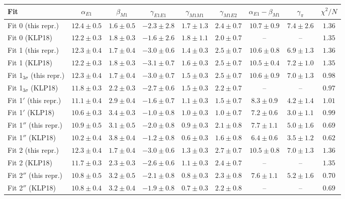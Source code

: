 \begin{tabular}{l|ccccccc|c}
\hline
Fit & $\alpha_{E1}$ & $\beta_{M1}$ & $\gamma_{E1E1}$ & $\gamma_{M1M1}$ & $\gamma_{M1E2}$ & $\alpha_{E1}-\beta_{M1}$ & $\gamma_\pi$ & $\chi^2/N$\\\hline
Fit 0 (this repr.) & $12.4\pm0.5$ & $1.6\pm0.5$ & $-2.3\pm2.8$ & $1.7\pm1.3$ & $2.4\pm0.7$ & $10.7\pm0.9$ & $7.4\pm2.6$ & $1.36$\\
Fit 0 (KLP18) & $12.2\pm0.3$ & $1.8\pm0.3$ & $-1.6\pm2.6$ & $1.8\pm1.1$ & $2.0\pm0.7$ & -- & -- & $1.35$\\\hline
Fit 1 (this repr.) & $12.3\pm0.4$ & $1.7\pm0.4$ & $-3.0\pm0.6$ & $1.4\pm0.3$ & $2.5\pm0.7$ & $10.6\pm0.8$ & $6.9\pm1.3$ & $1.36$\\
Fit 1 (KLP18) & $12.2\pm0.3$ & $1.8\pm0.3$ & $-3.1\pm0.7$ & $1.6\pm0.3$ & $2.5\pm0.7$ & $10.5\pm0.4$ & $7.2\pm1.0$ & $1.35$\\\hline
Fit 1$_{3\sigma}$ (this repr.) & $12.3\pm0.4$ & $1.7\pm0.4$ & $-3.0\pm0.7$ & $1.5\pm0.3$ & $2.5\pm0.7$ & $10.6\pm0.9$ & $7.0\pm1.3$ & $0.98$\\
Fit 1$_{3\sigma}$ (KLP18) & $11.8\pm0.3$ & $2.2\pm0.3$ & $-2.7\pm0.6$ & $1.5\pm0.3$ & $2.2\pm0.7$ & -- & -- & $0.97$\\\hline
Fit 1$'$ (this repr.) & $11.1\pm0.4$ & $2.9\pm0.4$ & $-1.6\pm0.7$ & $1.1\pm0.3$ & $1.5\pm0.7$ & $8.3\pm0.9$ & $4.2\pm1.4$ & $1.01$\\
Fit 1$'$ (KLP18) & $10.6\pm0.3$ & $3.4\pm0.3$ & $-1.0\pm0.8$ & $1.0\pm0.3$ & $1.0\pm0.7$ & $7.2\pm0.6$ & $3.0\pm1.1$ & $0.99$\\\hline
Fit 1$''$ (this repr.) & $10.9\pm0.5$ & $3.1\pm0.5$ & $-2.0\pm0.8$ & $0.9\pm0.3$ & $2.1\pm0.8$ & $7.7\pm1.1$ & $5.0\pm1.6$ & $0.69$\\
Fit 1$''$ (KLP18) & $10.2\pm0.4$ & $3.8\pm0.4$ & $-1.2\pm0.8$ & $0.6\pm0.3$ & $1.6\pm0.8$ & $6.4\pm0.6$ & $3.5\pm1.2$ & $0.62$\\\hline
Fit 2 (this repr.) & $12.3\pm0.4$ & $1.7\pm0.4$ & $-3.0\pm0.6$ & $1.3\pm0.3$ & $2.7\pm0.7$ & $10.5\pm0.8$ & $7.0\pm1.3$ & $1.36$\\
Fit 2 (KLP18) & $11.7\pm0.3$ & $2.3\pm0.3$ & $-2.6\pm0.6$ & $1.1\pm0.3$ & $2.4\pm0.7$ & -- & -- & $1.35$\\\hline
Fit 2$''$ (this repr.) & $10.8\pm0.5$ & $3.2\pm0.5$ & $-2.1\pm0.8$ & $0.8\pm0.3$ & $2.3\pm0.8$ & $7.6\pm1.1$ & $5.2\pm1.6$ & $0.70$\\
Fit 2$''$ (KLP18) & $10.8\pm0.4$ & $3.2\pm0.4$ & $-1.9\pm0.8$ & $0.7\pm0.3$ & $2.2\pm0.8$ & -- & -- & $0.69$\\\hline
\end{tabular}

